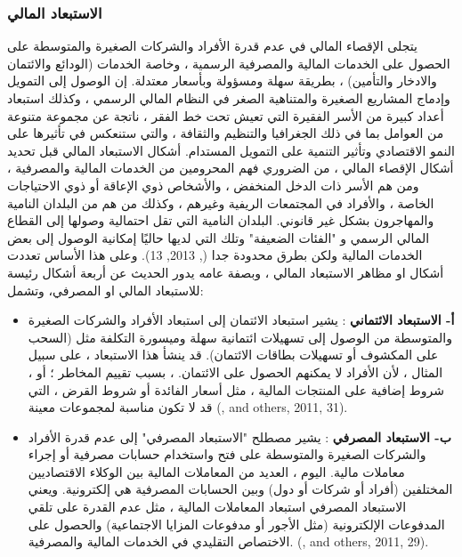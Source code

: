\documentclass[10pt,a4paper]{report}
\begin{document}
\begin{doublespacing}
\subsubsection{الاستبعاد المالي}
يتجلى الإقصاء المالي في عدم قدرة الأفراد والشركات الصغيرة والمتوسطة على الحصول على الخدمات المالية والمصرفية الرسمية ، وخاصة الخدمات (الودائع والائتمان والادخار والتأمين) ، بطريقة سهلة ومسؤولة وبأسعار معتدلة. إن الوصول إلى التمويل وإدماج المشاريع الصغيرة والمتناهية الصغر في النظام المالي الرسمي ، وكذلك استبعاد أعداد كبيرة من الأسر الفقيرة التي تعيش تحت خط الفقر ، ناتجة عن مجموعة متنوعة من العوامل بما في ذلك الجغرافيا والتنظيم والثقافة ، والتي ستنعكس في تأثيرها على النمو الاقتصادي وتأثير التنمية على التمويل المستدام. أشكال الاستبعاد المالي قبل تحديد أشكال الإقصاء المالي ، من الضروري فهم المحرومين من الخدمات المالية والمصرفية ، ومن هم الأسر ذات الدخل المنخفض ، والأشخاص ذوي الإعاقة أو ذوي الاحتياجات الخاصة ، والأفراد في المجتمعات الريفية وغيرهم ، وكذلك من هم من البلدان النامية والمهاجرون بشكل غير قانوني. البلدان النامية التي تقل احتمالية وصولها إلى القطاع المالي الرسمي و "الفئات الضعيفة" وتلك التي لديها حاليًا إمكانية الوصول إلى بعض الخدمات المالية ولكن بطرق محدودة جدا (, 2013, 13). وعلى هذا الأساس تعددت أشكال او مظاهر الاستبعاد المالي ، وبصفة عامه يدور الحديث عن أربعة أشكال رئيسة للاستبعاد المالي او المصرفي، وتشمل: 

\begin{itemize}
	\item \textbf{أ- الاستبعاد الائتماني }: 
	يشير استبعاد الائتمان إلى استبعاد الأفراد والشركات الصغيرة والمتوسطة من الوصول إلى تسهيلات ائتمانية سهلة وميسورة التكلفة مثل (السحب على المكشوف أو تسهيلات بطاقات الائتمان). قد ينشأ هذا الاستبعاد ، على سبيل المثال ، لأن الأفراد لا يمكنهم الحصول على الائتمان. ، بسبب تقييم المخاطر ؛ أو ، شروط إضافية على المنتجات المالية ، مثل أسعار الفائدة أو شروط القرض ، التي قد لا تكون مناسبة لمجموعات معينة (, and others, 2011, 31).
	
	\item \textbf{ب- الاستبعاد المصرفي }: 
	يشير مصطلح "الاستبعاد المصرفي" إلى عدم قدرة الأفراد والشركات الصغيرة والمتوسطة على فتح واستخدام حسابات مصرفية أو إجراء معاملات مالية. اليوم ، العديد من المعاملات المالية بين الوكلاء الاقتصاديين المختلفين (أفراد أو شركات أو دول) وبين الحسابات المصرفية هي إلكترونية. ويعني الاستبعاد المصرفي استبعاد المعاملات المالية ، مثل عدم القدرة على تلقي المدفوعات الإلكترونية (مثل الأجور أو مدفوعات المزايا الاجتماعية) والحصول على الاختصاص التقليدي في الخدمات المالية والمصرفية. (, and others, 2011, 29).
	

\end{itemize}
\end{doublespacing}
\end{document}
